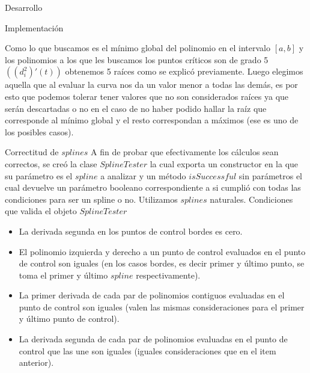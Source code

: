 \begin{section}{Desarrollo}
\begin{subsection}{Implementación}
\begin{itemize}
				Como lo que buscamos es el mínimo global del polinomio en el intervalo $[a,b]$ y los polinomios a los que les buscamos los puntos críticos son de grado 5 $((d_i^2)'(t))$ obtenemos 5 raíces como se explicó previamente. Luego elegimos aquella que al evaluar la curva nos da un valor menor a todas las demás, es por esto que podemos tolerar tener valores que no son considerados raíces ya que serán descartadas o no en el caso de no haber podido hallar la raíz que corresponde al mínimo global y el resto correspondan a máximos (ese es uno de los posibles casos).
		\end{itemize}
	\end{subsection}
	\begin{subsection}{Correctitud de $splines$}
		A fin de probar que efectivamente los cálculos sean correctos, se creó la clase $SplineTester$ la cual exporta un constructor en la que su parámetro es el $spline$ a analizar y un método $isSuccessful$ sin parámetros el cual devuelve un parámetro booleano correspondiente a si cumplió con todas las condiciones para ser un spline o no.
		Utilizamos $splines$ naturales.
		Condiciones que valida el objeto $SplineTester$
		\begin{itemize}
			\item La derivada segunda en los puntos de control bordes es cero.
			\item El polinomio izquierda y derecho a un punto de control evaluados en el punto de control son iguales (en los casos bordes, es decir primer y último punto, se toma el primer y último $spline$ respectivamente).
			\item La primer derivada de cada par de polinomios contiguos evaluadas en el punto de control son iguales (valen las mismas consideraciones para el primer y último punto de control).
			\item La derivada segunda de cada par de polinomios evaluadas en el punto de control que las une son iguales (iguales consideraciones que en el item anterior).
		\end{itemize}
		
	
	\end{subsection}
\end{section}
